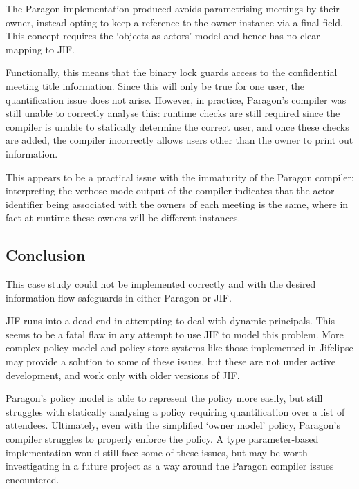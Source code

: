 The Paragon implementation produced avoids parametrising meetings by their owner, instead opting to keep a reference to the owner instance via a final field. This concept requires the `objects as actors' model and hence has no clear mapping to JIF.

Functionally, this means that the binary lock  guards access to the confidential meeting title information. Since this will only be true for one user, the quantification issue does not arise. However, in practice, Paragon's compiler was still unable to correctly analyse this: runtime checks are still required since the compiler is unable to statically determine the correct user, and once these checks are added, the compiler incorrectly allows users other than the owner to print out information.

This appears to be a practical issue with the immaturity of the Paragon compiler: interpreting the verbose-mode output of the compiler indicates that the actor identifier being associated with the owners of each meeting is the same, where in fact at runtime these owners will be different instances.

\subsection{Conclusion}

This case study could not be implemented correctly and with the desired information flow safeguards in either Paragon or JIF.

JIF runs into a dead end in attempting to deal with dynamic principals. This seems to be a fatal flaw in any attempt to use JIF to model this problem. More complex policy model and policy store systems like those implemented in Jifclipse \cite{hicks2007jifclipse} may provide a solution to some of these issues, but these are not under active development, and work only with older versions of JIF.

Paragon's policy model is able to represent the policy more easily, but still struggles with statically analysing a policy requiring quantification over a list of attendees. Ultimately, even with the simplified `owner model' policy, Paragon's compiler struggles to properly enforce the policy. A type parameter-based implementation would still face some of these issues, but may be worth investigating in a future project as a way around the Paragon compiler issues encountered.
